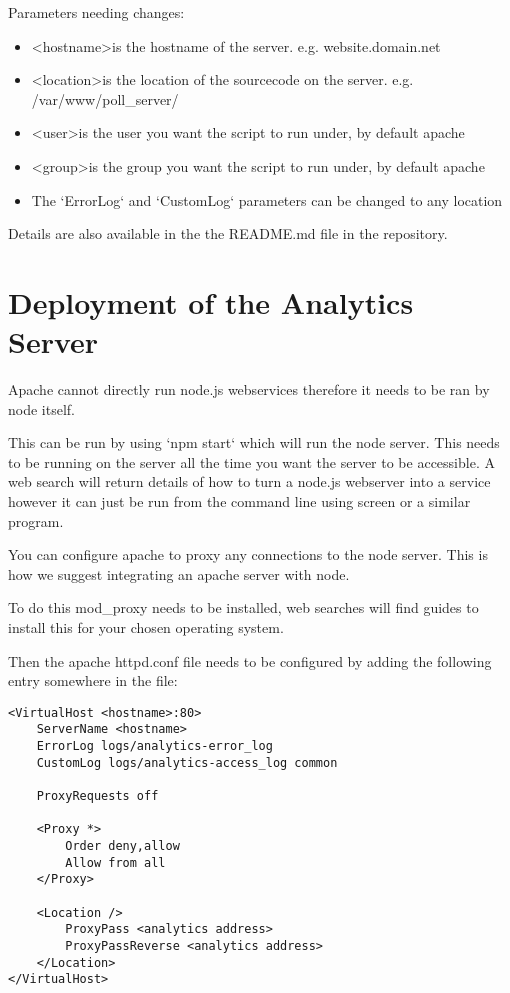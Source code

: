 Parameters needing changes:

\begin{itemize}
\item \textless hostname\textgreater is the hostname of the server. e.g. website.domain.net
\item \textless location\textgreater is the location of the sourcecode on the server. e.g. /var/www/poll\_server/
\item \textless user\textgreater is the user you want the script to run under, by default apache
\item \textless group\textgreater is the group you want the script to run under, by default apache
\item The `ErrorLog` and `CustomLog` parameters can be changed to any location

\end{itemize}

Details are also available in the the README.md file in the repository.

\chapter{Deployment of the Analytics Server} \label{Chapter:Deployment Analytics Server}

Apache cannot directly run node.js webservices therefore it needs to be ran by node itself.

This can be run by using `npm start` which will run the node server. This needs to be running on the server all the time you want the server to be accessible.
A web search will return details of how to turn a node.js webserver into a service however it can just be run from the command line using screen or a similar program.

You can configure apache to proxy any connections to the node server. This is how we suggest integrating an apache server with node.

To do this mod\_proxy needs to be installed, web searches will find guides to install this for your chosen operating system.

Then the apache httpd.conf file needs to be configured by adding the following entry somewhere in the file:

\begin{lstlisting}[caption={\label{code:apacheConfig2} Apache configuration}]
<VirtualHost <hostname>:80>
	ServerName <hostname>
	ErrorLog logs/analytics-error_log
	CustomLog logs/analytics-access_log common

	ProxyRequests off
	
	<Proxy *>
		Order deny,allow
		Allow from all
	</Proxy>

	<Location />
		ProxyPass <analytics address>
		ProxyPassReverse <analytics address>
	</Location>
</VirtualHost>
\end{lstlisting}

